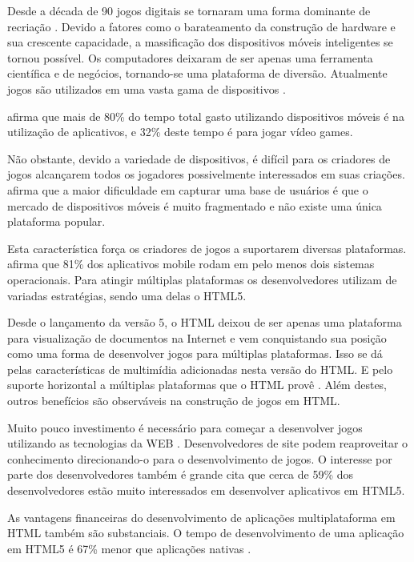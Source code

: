 
Desde a década de 90 jogos digitais se tornaram uma forma dominante
de recriação \autocite{gameDesignPatterns}. Devido a fatores como o
barateamento da construção de hardware e sua crescente capacidade, a massificação
dos dispositivos móveis inteligentes se tornou possível. Os
computadores deixaram de ser apenas uma ferramenta científica e de
negócios, tornando-se uma plataforma de diversão. Atualmente jogos
são utilizados em uma vasta gama de dispositivos \autocite[pp.
6]{crossPlatformMobileGameDevelopment}.

\autocite{HTML5CrossPlatformGameDevelopment} afirma que mais de 80\% do
tempo total gasto utilizando dispositivos móveis é na utilização de
aplicativos, e 32\% deste tempo é para jogar vídeo games.

Não obstante, devido a variedade de dispositivos, é difícil para
os criadores de jogos alcançarem todos os jogadores possivelmente
interessados em suas criações. \cite{html5Tradeoffs} afirma que a
maior dificuldade em capturar uma base de usuários é que o mercado
de dispositivos móveis é muito fragmentado e não existe uma única
plataforma popular.

Esta característica força os criadores de jogos a suportarem diversas
plataformas. \autocite{htmlSurvey} afirma que 81\% dos aplicativos
mobile rodam em pelo menos dois sistemas operacionais. Para atingir
múltiplas plataformas os desenvolvedores utilizam de variadas
estratégias, sendo uma delas o HTML5.

Desde o lançamento da versão 5, o HTML deixou de ser apenas uma
plataforma para visualização de documentos na Internet e vem
conquistando sua posição como uma forma de desenvolver jogos
para múltiplas plataformas. Isso se dá pelas características de
multimídia adicionadas nesta versão do HTML. E pelo suporte horizontal
a múltiplas plataformas que o HTML provê \autocite{html5Tradeoffs}.
Além destes, outros benefícios são observáveis na construção de
jogos em HTML.

Muito pouco investimento é necessário para começar a desenvolver
jogos utilizando as tecnologias da WEB \autocite{html5mostwanted}.
Desenvolvedores de site podem reaproveitar o conhecimento direcionando-o
para o desenvolvimento de jogos. O interesse por parte dos
desenvolvedores também é grande \autocite{htmlSurvey} cita que cerca
de 59\% dos desenvolvedores estão muito interessados em desenvolver
aplicativos em HTML5.

As vantagens financeiras do desenvolvimento de aplicações
multiplataforma em HTML também são substanciais. O tempo de
desenvolvimento de uma aplicação em HTML5 é 67\% menor que
aplicações nativas \autocite[pp. 460]{html5Tradeoffs}.

